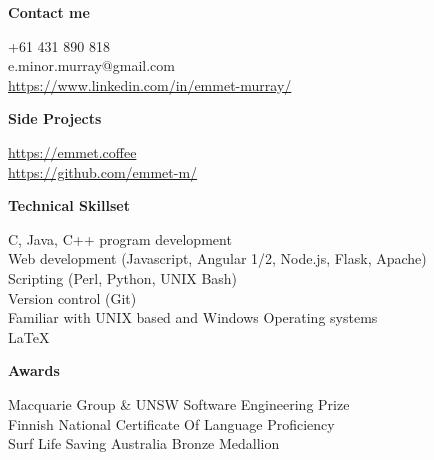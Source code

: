 \documentclass{article}
\newcommand{\mytitle}[1]{{\Large \textbf{#1}} \vspace{0.2cm}}
\begin{document}
\begin{minipage}[t]{0.3\linewidth}
    \vspace{0.2cm}
    {
        \mytitle{Contact me}
        
        +61 431 890 818 \\
        e.minor.murray@gmail.com \\
        \href{https://emmet.coffe://www.linkedin.com/in/emmet-murray/}{https://www.linkedin.com/in/emmet-murray/} \\

    }
    \vspace{0.2cm}
    {
        \mytitle{Side Projects}
        
        \href{https://emmet.coffee}{https://emmet.coffee} \\
        \href{https://github.com/emmet-m/}{https://github.com/emmet-m/} \\
        
    }
    \vspace{0.3cm}
    
    {
        \mytitle{Technical Skillset}

        C, Java, C++ program development \\ 

        Web development (Javascript, Angular 1/2, Node.js, Flask, Apache) \\

        Scripting (Perl, Python, UNIX Bash) \\

        Version control (Git) \\

        Familiar with UNIX based and Windows Operating systems \\

        {\large \LaTeX}
    }

    \vspace{0.5cm}

    {
        \mytitle{Awards}

        Macquarie Group \& UNSW Software Engineering Prize \\

        Finnish National Certificate Of Language Proficiency \\

        Surf Life Saving Australia Bronze Medallion
    }
%
%
\end{minipage}
%
\end{document}
